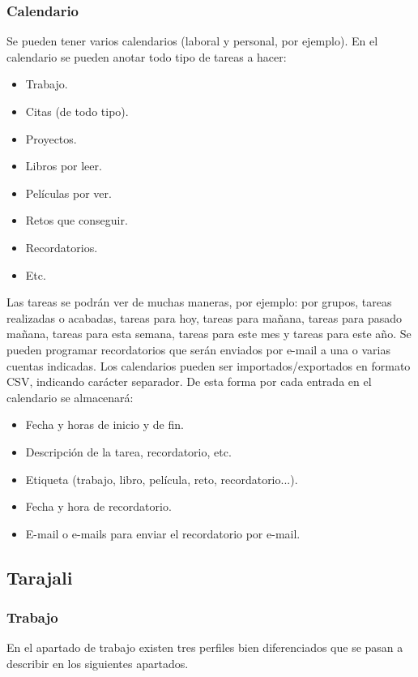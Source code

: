\documentclass[12pt,twoside,a4paper]{article}
\begin{document}
\subsubsection{Calendario}
Se pueden tener varios calendarios (laboral y personal, por ejemplo). En el calendario se pueden anotar todo tipo de tareas a hacer:
\begin{itemize}
\item Trabajo.
\item Citas (de todo tipo).
\item Proyectos.
\item Libros por leer.
\item Películas por ver.
\item Retos que conseguir.
\item Recordatorios.
\item Etc.
\end{itemize}
Las tareas se podrán ver de muchas maneras, por ejemplo: por grupos, tareas realizadas o acabadas, tareas para hoy, tareas para mañana, tareas para pasado mañana, tareas para esta semana, tareas para este mes y tareas para este año.
Se pueden programar recordatorios que serán enviados por e-mail a una o varias cuentas indicadas.
Los calendarios pueden ser importados/exportados en formato CSV, indicando carácter separador.
De esta forma por cada entrada en el calendario se almacenará:
\begin{itemize}
\item Fecha y horas de inicio y de fin.
\item Descripción de la tarea, recordatorio, etc.
\item Etiqueta (trabajo, libro, película, reto, recordatorio...).
\item Fecha y hora de recordatorio.
\item E-mail o e-mails para enviar el recordatorio por e-mail.
\end{itemize}

\subsection{Tarajali}
\subsubsection{Trabajo}
En el apartado de trabajo existen tres perfiles bien diferenciados que se pasan a describir en los siguientes apartados.
\end{document}
